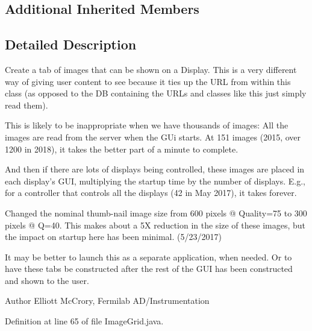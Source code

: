 \subsection*{Additional Inherited Members}


\subsection{Detailed Description}
Create a tab of images that can be shown on a Display. This is a very different way of giving user content to see because it ties up the U\-R\-L from within this class (as opposed to the D\-B containing the U\-R\-Ls and classes like this just simply read them).

This is likely to be inappropriate when we have thousands of images\-: All the images are read from the server when the G\-Ui starts. At 151 images (2015, over 1200 in 2018), it takes the better part of a minute to complete.

And then if there are lots of displays being controlled, these images are placed in each display's G\-U\-I, multiplying the startup time by the number of displays. E.\-g., for a controller that controls all the displays (42 in May 2017), it takes forever.

Changed the nominal thumb-\/nail image size from 600 pixels @ Quality=75 to 300 pixels @ Q=40. This makes about a 5\-X reduction in the size of these images, but the impact on startup here has been minimal. (5/23/2017)

It may be better to launch this as a separate application, when needed. Or to have these tabs be constructed after the rest of the G\-U\-I has been constructed and shown to the user.

\begin{DoxyAuthor}{Author}
Elliott Mc\-Crory, Fermilab A\-D/\-Instrumentation 
\end{DoxyAuthor}


Definition at line 65 of file Image\-Grid.\-java.



